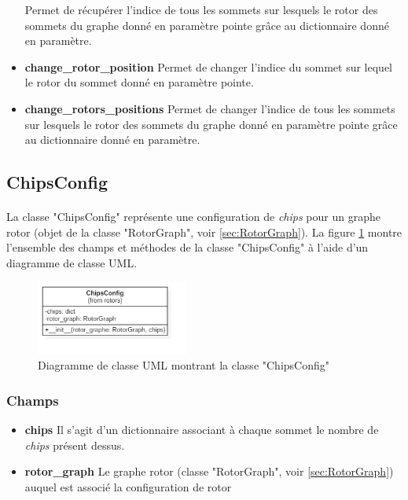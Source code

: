 \documentclass{article}
\begin{document}
\begin{itemize}
                    Permet de récupérer l'indice de tous les sommets sur lesquels le rotor des sommets du graphe donné en paramètre pointe grâce au dictionnaire donné en paramètre.
                    \item \textbf{change\_rotor\_position}\newline
                    Permet de changer l'indice du sommet sur lequel le rotor du sommet donné en paramètre pointe.
                    \item \textbf{change\_rotors\_positions}\newline
                    Permet de changer l'indice de tous les sommets sur lesquels le rotor des sommets du graphe donné en paramètre pointe grâce au dictionnaire donné en paramètre.
                \end{itemize}
	
		\subsection{ChipsConfig}
			\paragraph*{}
			La classe "ChipsConfig" représente une configuration de \textit{chips} pour un graphe rotor (objet de la classe "RotorGraph", voir \ref{sec:RotorGraph}). La figure \ref{fig:diagClassChipsConfig} montre l'ensemble des champs et méthodes de la classe "ChipsConfig" à l'aide d'un diagramme de classe UML.
			
			\begin{figure}[h]
				\includegraphics[width=5cm]{diagClassChipsConfig.png}
				\centering
				\caption{Diagramme de classe UML montrant la classe "ChipsConfig"}
				\label{fig:diagClassChipsConfig}
			\end{figure}
		
			\subsubsection{Champs}
				\begin{itemize}
					\item \textbf{chips}\newline
					Il s'agit d'un dictionnaire associant à chaque sommet le nombre de \textit{chips} présent dessus.
					\item \textbf{rotor\_graph}\newline
					Le graphe rotor (classe "RotorGraph", voir \ref{sec:RotorGraph}) auquel est associé la configuration de rotor
				\end{itemize}
		
\end{document}
